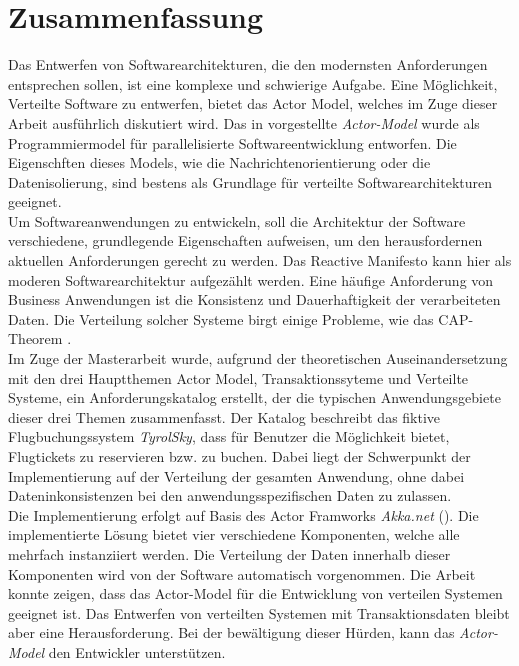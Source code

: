 \chapter*{Zusammenfassung}
Das Entwerfen von Softwarearchitekturen, die den modernsten Anforderungen entsprechen sollen, ist eine komplexe und schwierige Aufgabe. Eine Möglichkeit, Verteilte Software zu entwerfen, bietet das Actor Model, welches im Zuge dieser Arbeit ausführlich diskutiert wird. Das in \cite{Hewitt1973AIntelligence} vorgestellte \textit{Actor-Model} wurde als Programmiermodel für parallelisierte Softwareentwicklung entworfen. Die Eigenschften dieses Models, wie die Nachrichtenorientierung oder die Datenisolierung, sind bestens als Grundlage für verteilte Softwarearchitekturen geeignet. \\
Um Softwareanwendungen zu entwickeln, soll die Architektur der Software verschiedene, grundlegende Eigenschaften aufweisen, um den herausfordernen aktuellen Anforderungen gerecht zu werden. Das Reactive Manifesto kann hier als moderen Softwarearchitektur aufgezählt werden.
Eine häufige Anforderung von Business Anwendungen ist die Konsistenz und Dauerhaftigkeit der verarbeiteten Daten. Die Verteilung solcher Systeme birgt einige Probleme, wie das CAP-Theorem \citep{gilbertPerspectiveCAPTheorem2012}. \\
Im Zuge der Masterarbeit wurde, aufgrund der theoretischen Auseinandersetzung mit den drei Hauptthemen Actor Model, Transaktionssyteme und Verteilte Systeme, ein Anforderungskatalog erstellt, der die typischen Anwendungsgebiete dieser drei Themen zusammenfasst. Der Katalog beschreibt das fiktive Flugbuchungssystem \textit{TyrolSky}, dass für Benutzer die Möglichkeit bietet, Flugtickets zu reservieren bzw. zu buchen. Dabei liegt der Schwerpunkt der Implementierung auf der Verteilung der gesamten Anwendung, ohne dabei Dateninkonsistenzen bei den anwendungsspezifischen Daten zu zulassen. \\
Die Implementierung erfolgt auf Basis des Actor Framworks \textit{Akka.net} (\cite{Akka.netCommunityAkka.NETDocumentation}). Die implementierte Lösung bietet vier verschiedene Komponenten, welche alle mehrfach instanziiert werden. Die Verteilung der Daten innerhalb dieser Komponenten wird von der Software automatisch vorgenommen.
Die Arbeit konnte zeigen, dass das Actor-Model für die Entwicklung von verteilen Systemen geeignet ist. Das Entwerfen von verteilten Systemen mit Transaktionsdaten bleibt aber eine Herausforderung. Bei der bewältigung dieser Hürden, kann das \textit{Actor-Model} den Entwickler unterstützen.

\cleardoublepage
